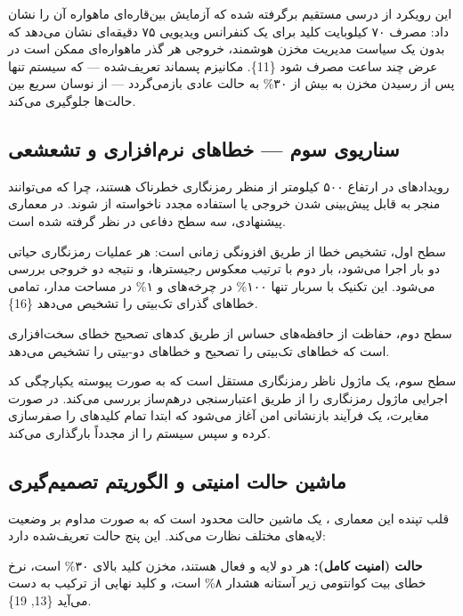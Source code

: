 \documentclass[a4paper,14pt]{extreport}
\begin{document}
این رویکرد از درسی مستقیم برگرفته شده که آزمایش بین‌قاره‌ای ماهواره  آن را نشان داد: مصرف ۷۰ کیلوبایت کلید  برای یک کنفرانس ویدیویی ۷۵ دقیقه‌ای نشان می‌دهد که بدون یک سیاست مدیریت مخزن هوشمند، خروجی هر گذر ماهواره‌ای ممکن است در عرض چند ساعت مصرف شود \{11\}. مکانیزم پسماند  تعریف‌شده --- که سیستم تنها پس از رسیدن مخزن به بیش از ۳۰\% به حالت عادی بازمی‌گردد --- از نوسان سریع بین حالت‌ها جلوگیری می‌کند.

\subsection{سناریوی سوم --- خطاهای نرم‌افزاری و تشعشعی}

رویدادهای  در ارتفاع ۵۰۰ کیلومتر از منظر رمزنگاری خطرناک هستند، چرا که می‌توانند منجر به قابل پیش‌بینی شدن خروجی  یا استفاده مجدد ناخواسته از  شوند. در معماری پیشنهادی، سه سطح دفاعی در نظر گرفته شده است.

سطح اول، تشخیص خطا از طریق افزونگی زمانی  است: هر عملیات رمزنگاری حیاتی دو بار اجرا می‌شود، بار دوم با ترتیب معکوس رجیسترها، و نتیجه  دو خروجی بررسی می‌شود. این تکنیک با سربار تنها ۱۰۰\% در چرخه‌های  و ۱\% در مساحت مدار، تمامی خطاهای گذرای تک‌بیتی را تشخیص می‌دهد \{16\}.

سطح دوم، حفاظت از حافظه‌های حساس از طریق کدهای تصحیح خطای  سخت‌افزاری است که خطاهای تک‌بیتی را تصحیح و خطاهای دو-بیتی را تشخیص می‌دهد.

سطح سوم، یک ماژول ناظر رمزنگاری  مستقل است که به صورت پیوسته یکپارچگی کد اجرایی ماژول رمزنگاری را از طریق اعتبارسنجی درهم‌ساز  بررسی می‌کند. در صورت مغایرت، یک فرآیند بازنشانی امن  آغاز می‌شود که ابتدا تمام کلیدهای  را صفرسازی کرده و سپس سیستم را از  مجدداً بارگذاری می‌کند.

\subsection{ماشین حالت امنیتی و الگوریتم تصمیم‌گیری}

قلب تپنده این معماری ، یک ماشین حالت محدود  است که به صورت مداوم بر وضعیت لایه‌های مختلف نظارت می‌کند. این  پنج حالت تعریف‌شده دارد:

\textbf{حالت  (امنیت کامل):} هر دو لایه  و  فعال هستند، مخزن کلید  بالای ۳۰\% است، نرخ خطای بیت کوانتومی  زیر آستانه هشدار ۸\% است، و کلید نهایی از ترکیب  به دست می‌آید \{13, 19\}.
\end{document}
